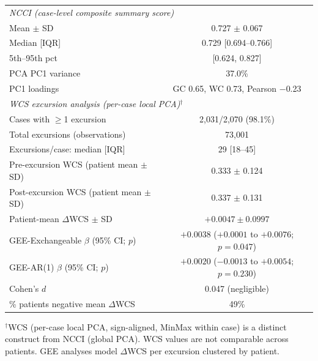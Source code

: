 \documentclass[fleqn,10pt,lineno]{wlpeerj}
\begin{document}
\begin{table}[H]
\begin{tabular}{lc}
\midrule
\multicolumn{2}{l}{\textit{NCCI (case-level composite summary score)}} \\
Mean $\pm$ SD                     & 0.727 $\pm$ 0.067 \\
Median [IQR]                      & 0.729 [0.694--0.766] \\
5th--95th pct                     & [0.624, 0.827] \\
PCA PC1 variance                  & 37.0\% \\
PC1 loadings                      & GC 0.65, WC 0.73, Pearson $-$0.23 \\
\midrule
\multicolumn{2}{l}{\textit{WCS excursion analysis (per-case local PCA)$^{\dagger}$}} \\
Cases with $\geq$1 excursion      & 2,031/2,070 (98.1\%) \\
Total excursions (observations)   & 73,001 \\
Excursions/case: median [IQR]     & 29 [18--45] \\
Pre-excursion WCS (patient mean $\pm$ SD)  & 0.333 $\pm$ 0.124 \\
Post-excursion WCS (patient mean $\pm$ SD) & 0.337 $\pm$ 0.131 \\
Patient-mean $\Delta$WCS $\pm$ SD & $+0.0047 \pm 0.0997$ \\
GEE-Exchangeable $\beta$ (95\% CI; $p$) & $+0.0038$ ($+0.0001$ to $+0.0076$; $p = 0.047$) \\
GEE-AR(1) $\beta$ (95\% CI; $p$)  & $+0.0020$ ($-0.0013$ to $+0.0054$; $p = 0.230$) \\
Cohen's $d$                       & 0.047 (negligible) \\
\% patients negative mean $\Delta$WCS & 49\% \\
\bottomrule
\end{tabular}

\vspace{4pt}
\footnotesize $^{\dagger}$WCS (per-case local PCA, sign-aligned, MinMax within case) is a
distinct construct from NCCI (global PCA). WCS values are not comparable across patients. GEE
analyses model $\Delta$WCS per excursion clustered by patient.
\end{table}
\end{document}

